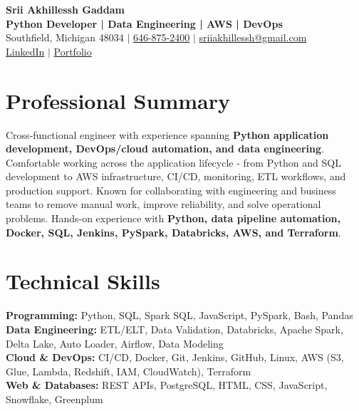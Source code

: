 \documentclass[letterpaper,10pt]{article}
\begin{document}
\fontsize{9.35pt}{10.45pt}\selectfont

\begin{center}
    {\LARGE \textbf{Srii Akhillessh Gaddam}} \\[-1pt]
    \textbf{Python Developer | Data Engineering | AWS | DevOps} \\[2pt]
    Southfield, Michigan 48034 $|$
    \href{tel:6468752400}{646-875-2400} $|$
    \href{mailto:sriiakhillessh@gmail.com}{sriiakhillessh@gmail.com} \\[1pt]
    \href{https://www.linkedin.com/in/srii-akhiilessh-gaddam-b48668191/}{LinkedIn} $|$
    \href{https://sriiakhillesshg.github.io/portfolio/}{Portfolio}
\end{center}
\vspace{-8pt}

\section{Professional Summary}
\small{Cross-functional engineer with experience spanning \textbf{Python application development, DevOps/cloud automation, and data engineering}. Comfortable working across the application lifecycle - from Python and SQL development to AWS infrastructure, CI/CD, monitoring, ETL workflows, and production support. Known for collaborating with engineering and business teams to remove manual work, improve reliability, and solve operational problems. Hands-on experience with \textbf{Python, data pipeline automation, Docker, SQL, Jenkins, PySpark, Databricks, AWS, and Terraform}.}

\section{Technical Skills}
\small{
\textbf{Programming:} Python, SQL, Spark SQL, JavaScript, PySpark, Bash, Pandas \\
\textbf{Data Engineering:} ETL/ELT, Data Validation, Databricks, Apache Spark, Delta Lake, Auto Loader, Airflow, Data Modeling \\
\textbf{Cloud \& DevOps:} CI/CD, Docker, Git, Jenkins, GitHub, Linux, AWS (S3, Glue, Lambda, Redshift, IAM, CloudWatch), Terraform \\
\textbf{Web \& Databases:} REST APIs, PostgreSQL, HTML, CSS, JavaScript, Snowflake, Greenplum
}
\end{document}
